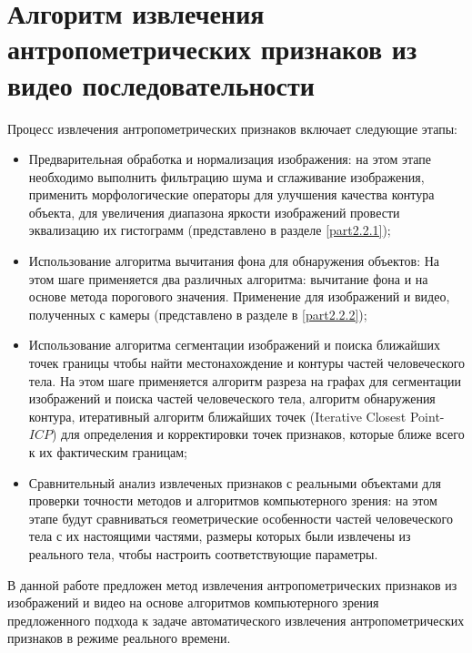 \section{Алгоритм извлечения антропометрических признаков из видео последовательности}

Процесс извлечения антропометрических признаков включает следующие этапы:

\begin{itemize}
	\item Предварительная обработка и нормализация изображения: на этом этапе необходимо выполнить фильтрацию шума и сглаживание изображения, применить морфологические операторы для улучшения качества контура объекта, для увеличения диапазона яркости изображений провести эквализацию их гистограмм (представлено в разделе \ref{part2.2.1});
	\item Использование алгоритма вычитания фона для обнаружения объектов: На этом шаге применяется два различных алгоритма: вычитание фона и на основе метода порогового значения. Применение для изображений и видео, полученных с камеры (представлено в разделе в \ref{part2.2.2});
	\item Использование алгоритма сегментации изображений и поиска ближайших точек границы чтобы найти местонахождение и контуры частей человеческого тела. На этом шаге применяется алгоритм разреза на графах для сегментации изображений и поиска частей человеческого тела, алгоритм обнаружения контура, итеративный алгоритм ближайших точек (Iterative Closest Point-$ICP$) для определения и корректировки точек признаков, которые ближе всего к их фактическим границам;
	\item Сравнительный анализ извлеченых признаков с реальными объектами для проверки точности методов и алгоритмов компьютерного зрения: на этом этапе будут сравниваться геометрические особенности частей человеческого тела с их настоящими частями, размеры которых были извлечены из реального тела, чтобы настроить соответствующие параметры.
\end{itemize}

В данной работе предложен метод извлечения антропометрических признаков из изображений и видео на основе алгоритмов компьютерного зрения предложенного подхода к задаче автоматического извлечения антропометрических признаков в режиме реального времени.







